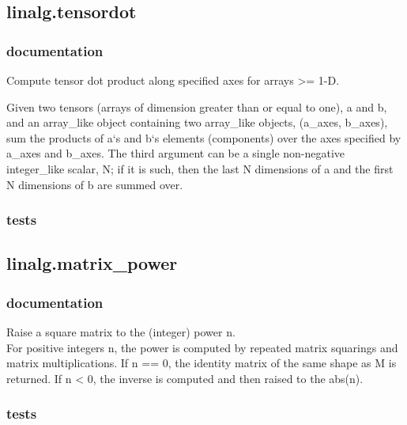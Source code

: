 \documentclass[a4paper,11pt]{article}
\begin{document}
\subsection{linalg.tensordot}
\subsubsection{documentation}
Compute tensor dot product along specified axes for arrays >= 1-D.

Given two tensors (arrays of dimension greater than or equal to one), a and b, and an array\_like object containing two array\_like objects, (a\_axes, b\_axes), sum the products of a‘s and b‘s elements (components) over the axes specified by a\_axes and b\_axes. The third argument can be a single non-negative integer\_like scalar, N; if it is such, then the last N dimensions of a and the first N dimensions of b are summed over.

\subsubsection{tests}


\subsection{linalg.matrix\_power}
\subsubsection{documentation}
Raise a square matrix to the (integer) power n.\\

For positive integers n, the power is computed by repeated matrix squarings and matrix multiplications. If n == 0, the identity matrix of the same shape as M is returned. If n < 0, the inverse is computed and then raised to the abs(n).
\subsubsection{tests}
\end{document}

